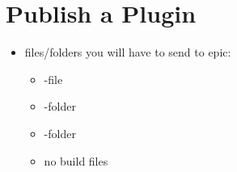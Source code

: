     \section{Publish a Plugin}
        \begin{itemize}
            \item files/folders you will have to send to epic:
            \begin{itemize}
                \item {}-file
                 \item {}-folder
                 \item {}-folder
                 \item no build files
            \end{itemize}
        \end{itemize}